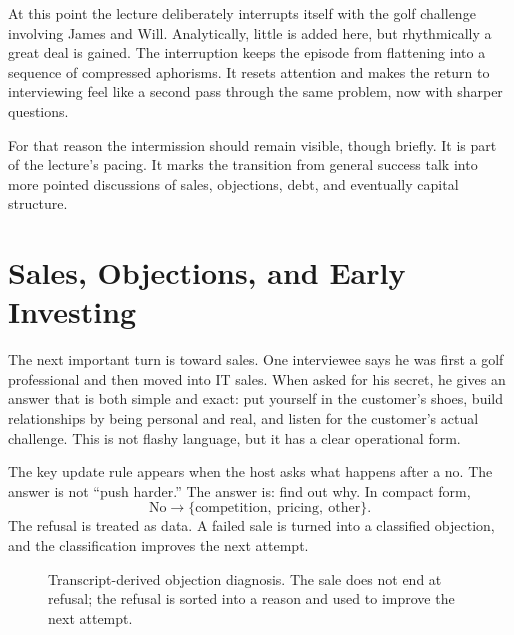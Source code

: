 At this point the lecture deliberately interrupts itself with the golf challenge involving James and Will. Analytically, little is added here, but rhythmically a great deal is gained. The interruption keeps the episode from flattening into a sequence of compressed aphorisms. It resets attention and makes the return to interviewing feel like a second pass through the same problem, now with sharper questions.

For that reason the intermission should remain visible, though briefly. It is part of the lecture's pacing. It marks the transition from general success talk into more pointed discussions of sales, objections, debt, and eventually capital structure.

\section{Sales, Objections, and Early Investing}

The next important turn is toward sales. One interviewee says he was first a golf professional and then moved into IT sales. When asked for his secret, he gives an answer that is both simple and exact: put yourself in the customer's shoes, build relationships by being personal and real, and listen for the customer's actual challenge. This is not flashy language, but it has a clear operational form.

The key update rule appears when the host asks what happens after a no. The answer is not ``push harder.'' The answer is: find out why. In compact form,
\begin{equation}
\text{No} \longrightarrow \{\text{competition},\ \text{pricing},\ \text{other}\}.
\end{equation}
The refusal is treated as data. A failed sale is turned into a classified objection, and the classification improves the next attempt.

\begin{figure}[h]
\centering
{}
\caption{Transcript-derived objection diagnosis. The sale does not end at refusal; the refusal is sorted into a reason and used to improve the next attempt.}
\end{figure}

